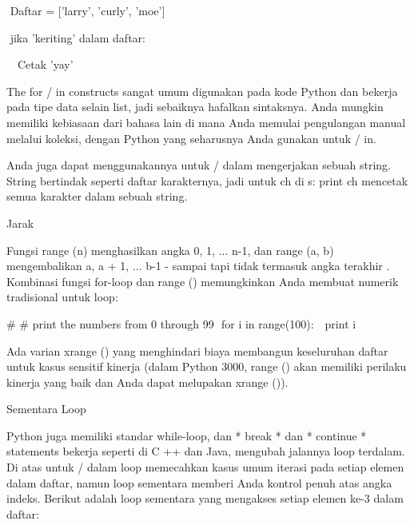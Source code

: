 \documentclass[a4paper,12pt]{report}
\begin{document}
\vspace{12pt}
\noindent 
 $  $ $  $Daftar = ['larry', 'curly', 'moe'] \par
\noindent 
 $  $ $  $jika 'keriting' dalam daftar: \par
\noindent 
 $  $ $  $ $  $ $  $Cetak 'yay' \par
\vspace{12pt}
\noindent 
The for / in constructs sangat umum digunakan pada kode Python dan bekerja pada tipe data selain list, jadi sebaiknya hafalkan sintaksnya. Anda mungkin memiliki kebiasaan dari bahasa lain di mana Anda memulai pengulangan manual melalui koleksi, dengan Python yang seharusnya Anda gunakan untuk / in. \par
\vspace{12pt}
\noindent 
Anda juga dapat menggunakannya untuk / dalam mengerjakan sebuah string. String bertindak seperti daftar karakternya, jadi untuk ch di s: print ch mencetak semua karakter dalam sebuah string. \par
\noindent 
Jarak \par
\vspace{12pt}
\noindent 
Fungsi range (n) menghasilkan angka 0, 1, ... n-1, dan range (a, b) mengembalikan a, a + 1, ... b-1 - sampai tapi tidak termasuk angka terakhir . Kombinasi fungsi for-loop dan range () memungkinkan Anda membuat numerik tradisional untuk loop: \par
\vspace{12pt}
\vspace{12pt}
\noindent 
 $  \#  $ $  \#  $ print the numbers from 0 through 99\vspace{\baselineskip}
 $  $ for i in range(100):\vspace{\baselineskip}
 $  $  $  $ print i \par
\vspace{14pt}
\noindent 
{\fontsize{14pt}{14pt}\selectfont Ada varian xrange () yang menghindari biaya membangun keseluruhan daftar untuk kasus sensitif kinerja (dalam Python 3000, range () akan memiliki perilaku kinerja yang baik dan Anda dapat melupakan xrange ()). \\} \par
\noindent 
{\fontsize{14pt}{14pt}\selectfont Sementara Loop \\} \par
\vspace{14pt}
\noindent 
{\fontsize{14pt}{14pt}\selectfont Python juga memiliki standar while-loop, dan * break * dan * continue * statements bekerja seperti di C ++ dan Java, mengubah jalannya loop terdalam. Di atas untuk / dalam loop memecahkan kasus umum iterasi pada setiap elemen dalam daftar, namun loop sementara memberi Anda kontrol penuh atas angka indeks. Berikut adalah loop sementara yang mengakses setiap elemen ke-3 dalam daftar: \\} \par
\end{document}
